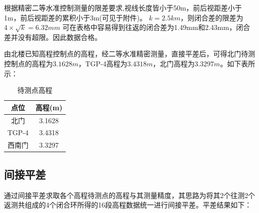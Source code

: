 \documentclass[a4paper,16pt,UTF8]{article}
\begin{document}
根据精密二等水准控制测量的限差要求,视线长度皆小于50m，前后视距差小于1m，前后视距差的累积小于3m(可见于附件)。
$k = 2.5km$，则闭合差的限差为$4 \times \sqrt{k} = 6.32 mm$
可在表格中容易得到往返的闭合差为1.49mm和2.43mm，闭合差并没有超限。因此数据合格。

由北楼已知高程控制点的高程，经二等水准精密测量，直接平差后，可得北门待测控制点的高程为$3.1628m$，TGP-4高程为$3.4318m$，北门高程为$3.3297m$。如下表所示：

\begin{center}
    \begin{longtable}{|c|c|}
        \caption{待测点高程} \\ \hline
        点位 & 高程(m)  \\ \hline
        北门 & 3.1628   \\ \hline
        TGP-4 & 3.4318 \\ \hline
        西南门 & 3.3297 \\ \hline
    \end{longtable}
\end{center}

\subsection{\Large 间接平差}
通过间接平差求取各个高程待测点的高程与其测量精度，其思路为将其2个往测2个返测共组成的4个闭合环所得的16段高程数据统一进行间接平差。平差结果如下：
\end{document}
